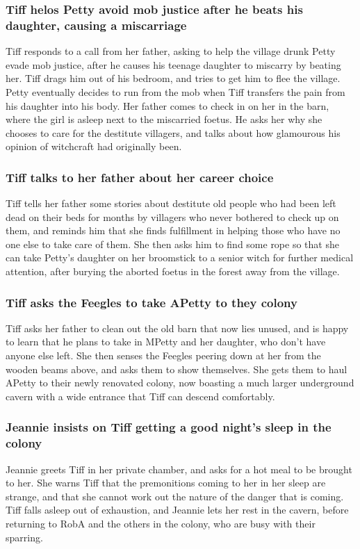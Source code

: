 \subsubsection{\Gls{Tiff} helos \Gls{Petty} avoid mob justice after he beats his daughter, causing
    a miscarriage}
\Gls{Tiff} responds to a call from her father, asking to help the village drunk \Gls{Petty} evade
mob justice, after he causes his teenage daughter to miscarry by beating her. \Gls{Tiff} drags him
out of his bedroom, and tries to get him to flee the village. \Gls{Petty} eventually decides to run
from the mob when \Gls{Tiff} transfers the pain from his daughter into his body. Her father comes to
check in on her in the barn, where the girl is asleep next to the miscarried foetus. He asks her why
she chooses to care for the destitute villagers, and talks about how glamourous his opinion of
witchcraft had originally been.

\subsubsection{\Gls{Tiff} talks to her father about her career choice}
\Gls{Tiff} tells her father some stories about destitute old people who had been left dead on their
beds for months by villagers who never bothered to check up on them, and reminds him that she finds
fulfillment in helping those who have no one else to take care of them. She then asks him to find
some rope so that she can take \Gls{Petty}'s daughter on her broomstick to a senior witch for
further medical attention, after burying the aborted foetus in the forest away from the village.

\subsubsection{\Gls{Tiff} asks the Feegles to take \Gls{APetty} to they colony}
\Gls{Tiff} asks her father to clean out the old barn that now lies unused, and is happy to learn
that he plans to take in \Gls{MPetty} and her daughter, who don't have anyone else left. She then
senses the Feegles peering down at her from the wooden beams above, and asks them to show
themselves. She gets them to haul \Gls{APetty} to their newly renovated colony, now boasting a
much larger underground cavern with a wide entrance that \Gls{Tiff} can descend comfortably.

\subsubsection{\Gls{Jeannie} insists on \Gls{Tiff} getting a good night's sleep in the colony}
\Gls{Jeannie} greets \Gls{Tiff} in her private chamber, and asks for a hot meal to be brought to
her. She warns \Gls{Tiff} that the premonitions coming to her in her sleep are strange, and that she
cannot work out the nature of the danger that is coming. \Gls{Tiff} falls asleep out of exhaustion,
and \Gls{Jeannie} lets her rest in the cavern, before returning to \Gls{RobA} and the others in the
colony, who are busy with their sparring.

